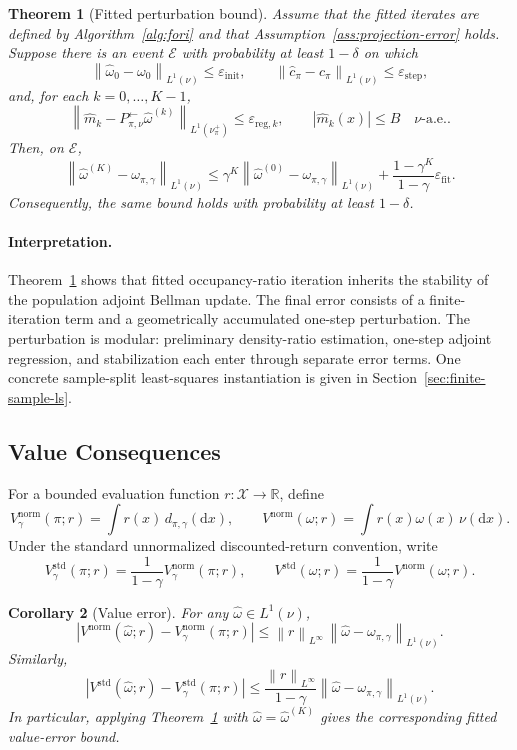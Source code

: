 \documentclass{article}
\newcommand{\sX}{\mathcal{X}}
\newcommand{\mhat}{\widehat m}
\newcommand{\R}{\mathbb{R}}
\newcommand{\1}{\mathbf{1}}
\newcommand{\dd}{\mathrm{d}}
\newcommand{\cpi}{c_\pi}
\newcommand{\omegazero}{\omega_0}
\newcommand{\omegastar}{\omega_{\pi,\gamma}}
\newcommand{\omegahatzero}{\widehat{\omega}_0}
\newcommand{\Pback}{P_{\pi,\nu}^{\leftarrow}}
\newcommand{\Mpi}{\Pback}
\newcommand{\omegahat}{\widehat{\omega}}
\newcommand{\chat}{\widehat{c}_\pi}
\newcommand{\norm}[2][]{\left\lVert #2 \right\rVert_{#1}}
\newcommand{\LoneNu}[1]{\norm[L^1(\nu)]{#1}}
\newcommand{\LoneNuPlus}[1]{\norm[L^1(\nu_\pi^+)]{#1}}
\newcommand{\Linfty}[1]{\norm[L^\infty]{#1}}
\newcommand{\abs}[1]{\left\lvert #1 \right\rvert}
\theoremstyle{plain}
\newtheorem{theorem}{Theorem}[section]
\newtheorem{corollary}[theorem]{Corollary}
\theoremstyle{definition}
\theoremstyle{remark}
\begin{document}
\begin{theorem}[Fitted perturbation bound]
\label{thm:oracle}
Assume that the fitted iterates are defined by Algorithm~\ref{alg:fori} and
that Assumption~\ref{ass:projection-error} holds. Suppose there is an event
$\mathcal E$ with probability at least $1-\delta$ on which
\[
    \LoneNu{\omegahatzero-\omegazero}
    \leq
    \varepsilon_{\mathrm{init}},
    \qquad
    \LoneNu{\chat-\cpi}
    \leq
    \varepsilon_{\mathrm{step}},
\]
and, for each $k=0,\ldots,K-1$,
\[
    \LoneNuPlus{\mhat_k-\Mpi\omegahat^{(k)}}
    \leq
    \varepsilon_{\mathrm{reg},k},
    \qquad
    \abs{\mhat_k(x)}\leq B\quad \nu\text{-a.e.}.
\]
Then, on $\mathcal E$,
\[
    \LoneNu{\omegahat^{(K)}-\omegastar}
    \leq
    \gamma^K\LoneNu{\omegahat^{(0)}-\omegastar}
    +
    \frac{1-\gamma^K}{1-\gamma}\varepsilon_{\mathrm{fit}}.
\]
Consequently, the same bound holds with probability at least $1-\delta$.
\end{theorem}

\paragraph{Interpretation.}
Theorem~\ref{thm:oracle} shows that fitted occupancy-ratio iteration inherits the
stability of the population adjoint Bellman update. The final error consists of
a finite-iteration term and a geometrically accumulated one-step perturbation.
The perturbation is modular: preliminary density-ratio estimation, one-step adjoint regression,
and stabilization each enter through separate error terms. One concrete
sample-split least-squares instantiation is given in
Section~\ref{sec:finite-sample-ls}.


\subsection{Value Consequences}

For a bounded evaluation function $r:\sX\to\R$, define
\[
    V_\gamma^{\mathrm{norm}}(\pi;r)
    =
    \int r(x)\,d_{\pi,\gamma}(\dd x),
    \qquad
    V^{\mathrm{norm}}(\omega;r)
    =
    \int r(x)\omega(x)\,\nu(\dd x).
\]
Under the standard unnormalized discounted-return convention, write
\[
    V_\gamma^{\mathrm{std}}(\pi;r)
    =
    \frac{1}{1-\gamma}V_\gamma^{\mathrm{norm}}(\pi;r),
    \qquad
    V^{\mathrm{std}}(\omega;r)
    =
    \frac{1}{1-\gamma}V^{\mathrm{norm}}(\omega;r).
\]

\begin{corollary}[Value error]
\label{cor:value-error}
For any $\widehat\omega\in L^1(\nu)$,
\[
    \abs{V^{\mathrm{norm}}(\widehat\omega;r)
    -
    V_\gamma^{\mathrm{norm}}(\pi;r)}
    \leq
    \Linfty{r}\,\LoneNu{\widehat\omega-\omegastar}.
\]
Similarly,
\[
    \abs{V^{\mathrm{std}}(\widehat\omega;r)
    -
    V_\gamma^{\mathrm{std}}(\pi;r)}
    \leq
    \frac{\Linfty{r}}{1-\gamma}
    \LoneNu{\widehat\omega-\omegastar}.
\]
In particular, applying Theorem~\ref{thm:oracle} with
$\widehat\omega=\omegahat^{(K)}$ gives the corresponding fitted value-error
bound.
\end{corollary}
\end{document}
